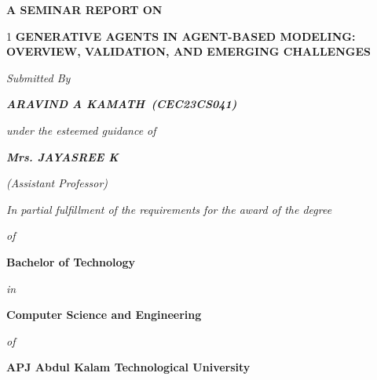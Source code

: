 \documentclass[12pt,a4paper]{report}
\newcommand{\studentname}{ARAVIND A KAMATH}
\newcommand{\rollno}{CEC23CS041}
\newcommand{\guidename}{Mrs. JAYASREE K}
\begin{document}

\begin{titlepage}
\thispagestyle{empty}
\begin{center}

\vspace*{0.2cm}

{\Large\bfseries A SEMINAR REPORT ON}\par

\vspace{0.45cm}

{\begin{spacing}{1}
\fontsize{16}{24}\selectfont\bfseries\centering
GENERATIVE AGENTS IN AGENT-BASED MODELING:\\
OVERVIEW, VALIDATION, AND EMERGING CHALLENGES\par
\end{spacing}}

\vspace{0.55cm}

{\large\itshape Submitted By}\par
\vspace{0.2cm}
{\large\bfseries\itshape \studentname\ (\rollno)}\par

\vspace{0.4cm}

{\large\itshape under the esteemed guidance of}\par
\vspace{0.2cm}
{\large\bfseries\itshape \guidename}\par
\vspace{0.1cm}
{\large\itshape (Assistant Professor)}\par

\vspace{0.4cm}

{\large\itshape In partial fulfillment of the requirements for the award of the degree}\par
{\large\itshape of}\par
{\large\bfseries Bachelor of Technology}\par
{\large\itshape in}\par
{\large\bfseries Computer Science and Engineering}\par
{\large\itshape of}\par
{\large\bfseries APJ Abdul Kalam Technological University}\par


\end{center}
\end{titlepage}
\end{document}
